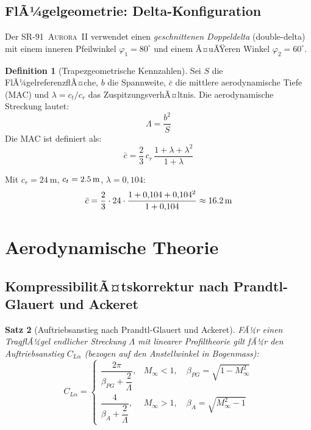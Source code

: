 ﻿\documentclass[12pt,a4paper]{article}
\theoremstyle{plain}
\newtheorem{theorem}{Satz}[section]
\theoremstyle{definition}
\newtheorem{definition}[theorem]{Definition}
\theoremstyle{remark}
\newcommand{\SR}{\textsc{SR-91~Aurora~II}}
\begin{document}
\subsection{FlÃ¼gelgeometrie: Delta-Konfiguration}

Der \SR{} verwendet einen \emph{geschnittenen Doppeldelta} (double-delta) mit
einem inneren Pfeilwinkel $\varphi_1 = 80^\circ$ und einem Ã¤uÃŸeren Winkel
$\varphi_2 = 60^\circ$.

\begin{definition}[Trapezgeometrische Kennzahlen]
  Sei $S$ die FlÃ¼gelreferenzflÃ¤che, $b$ die Spannweite, $\bar{c}$ die mittlere
  aerodynamische Tiefe (MAC) und $\lambda = c_t/c_r$ das ZuspitzungsverhÃ¤ltnis.
  Die aerodynamische Streckung lautet:
  \begin{equation}
    \Lambda = \frac{b^2}{S}
    \label{eq:streckung}
  \end{equation}
  Die MAC ist definiert als:
  \begin{equation}
    \bar{c} = \frac{2}{3}\,c_r\,\frac{1 + \lambda + \lambda^2}{1 + \lambda}
    \label{eq:mac}
  \end{equation}
\end{definition}

Mit $c_r = \SI{24}{\metre}$, $c_t = \SI{2{,}5}{\metre}$, $\lambda = 0{,}104$:
\begin{equation}
  \bar{c} = \frac{2}{3} \cdot 24 \cdot \frac{1 + 0{,}104 + 0{,}104^2}{1 + 0{,}104}
  \approx \SI{16{,}2}{\metre}
\end{equation}

\section{Aerodynamische Theorie}
\label{sec:aero}

\subsection{KompressibilitÃ¤tskorrektur nach Prandtl-Glauert und Ackeret}

\begin{theorem}[Auftriebsanstieg nach Prandtl-Glauert und Ackeret]
  \label{thm:cla}
  FÃ¼r einen TragflÃ¼gel endlicher Streckung $\Lambda$ mit linearer Profiltheorie gilt
  fÃ¼r den Auftriebsanstieg $C_{L\alpha}$ (bezogen auf den Anstellwinkel in Bogenmass):
  \begin{equation}
    C_{L\alpha} =
    \begin{cases}
      \dfrac{2\pi}{\beta_{PG} + \dfrac{2}{\Lambda}}, & M_\infty < 1, \quad \beta_{PG} = \sqrt{1 - M_\infty^2} \\[10pt]
      \dfrac{4}{\beta_A + \dfrac{2}{\Lambda}}, & M_\infty > 1, \quad \beta_A = \sqrt{M_\infty^2 - 1}
    \end{cases}
    \label{eq:cla}
  \end{equation}
\end{theorem}
\end{document}

